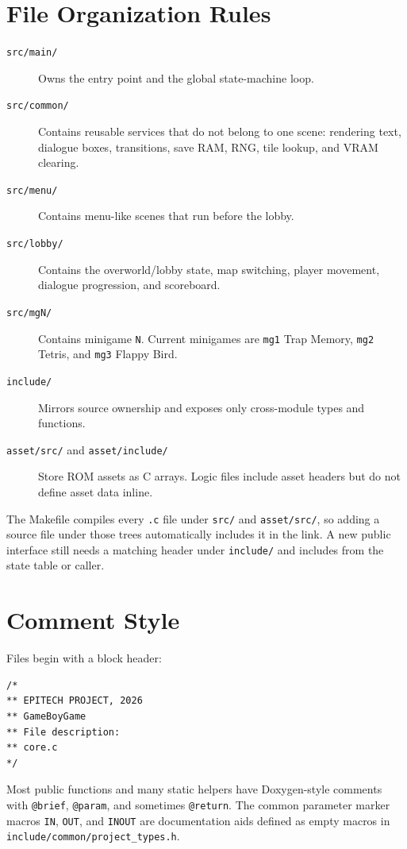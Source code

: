 \section{File Organization Rules}

\begin{description}
  \item[\texttt{src/main/}] Owns the entry point and the global state-machine loop.
  \item[\texttt{src/common/}] Contains reusable services that do not belong to one scene: rendering text, dialogue boxes, transitions, save RAM, RNG, tile lookup, and VRAM clearing.
  \item[\texttt{src/menu/}] Contains menu-like scenes that run before the lobby.
  \item[\texttt{src/lobby/}] Contains the overworld/lobby state, map switching, player movement, dialogue progression, and scoreboard.
  \item[\texttt{src/mgN/}] Contains minigame \texttt{N}. Current minigames are \texttt{mg1} Trap Memory, \texttt{mg2} Tetris, and \texttt{mg3} Flappy Bird.
  \item[\texttt{include/}] Mirrors source ownership and exposes only cross-module types and functions.
  \item[\texttt{asset/src/} and \texttt{asset/include/}] Store ROM assets as C arrays. Logic files include asset headers but do not define asset data inline.
\end{description}

The Makefile compiles every \texttt{.c} file under \texttt{src/} and \texttt{asset/src/}, so adding a source file under those trees automatically includes it in the link. A new public interface still needs a matching header under \texttt{include/} and includes from the state table or caller.

\section{Comment Style}

Files begin with a block header:

\begin{lstlisting}[caption={File header style}]
/*
** EPITECH PROJECT, 2026
** GameBoyGame
** File description:
** core.c
*/
\end{lstlisting}

Most public functions and many static helpers have Doxygen-style comments with \texttt{@brief}, \texttt{@param}, and sometimes \texttt{@return}. The common parameter marker macros \texttt{IN}, \texttt{OUT}, and \texttt{INOUT} are documentation aids defined as empty macros in \texttt{include/common/project\_types.h}.


